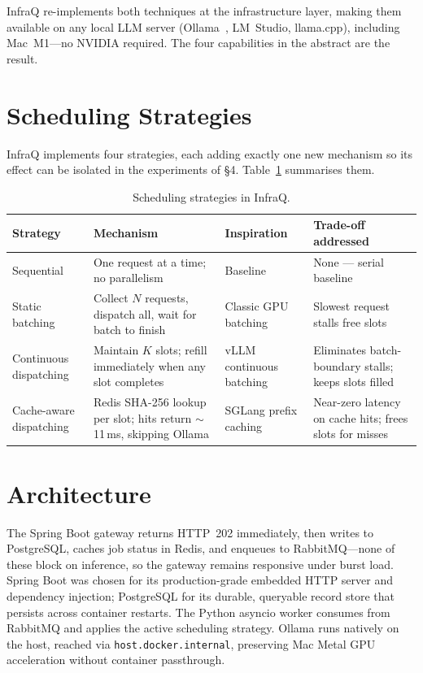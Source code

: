 \documentclass[10pt,a4paper]{article}
\begin{document}
InfraQ re-implements both techniques at the infrastructure layer, making them available
on any local LLM server (Ollama~\cite{ollama}, LM~Studio, llama.cpp), including
Mac~M1---no NVIDIA required. The four capabilities in the abstract are the result.

\section{Scheduling Strategies}

InfraQ implements four strategies, each adding exactly one new mechanism so its effect
can be isolated in the experiments of §4. Table~\ref{tab:strategies} summarises them.

\begin{table}[h]
\centering
\caption{Scheduling strategies in InfraQ.}
\label{tab:strategies}
\small\setlength{\tabcolsep}{5pt}
\renewcommand{\arraystretch}{1.25}
\begin{tabular}{lp{4.0cm}p{2.2cm}p{4.0cm}}
\toprule
Strategy & Mechanism & Inspiration & Trade-off addressed \\
\midrule
Sequential &
  One request at a time; no parallelism &
  Baseline &
  None --- serial baseline \\
Static batching &
  Collect $N$ requests, dispatch all, wait for batch to finish &
  Classic GPU batching &
  Slowest request stalls free slots \\
Continuous dispatching &
  Maintain $K$ slots; refill immediately when any slot completes &
  vLLM continuous batching &
  Eliminates batch-boundary stalls; keeps slots filled \\
Cache-aware dispatching &
  Redis SHA-256 lookup per slot; hits return $\sim$11\,ms, skipping Ollama &
  SGLang prefix caching &
  Near-zero latency on cache hits; frees slots for misses \\
\bottomrule
\end{tabular}
\end{table}

\section{Architecture}

The Spring Boot gateway returns HTTP~202 immediately, then writes to PostgreSQL,
caches job status in Redis, and enqueues to RabbitMQ---none of these block on inference,
so the gateway remains responsive under burst load.
Spring Boot was chosen for its production-grade embedded HTTP server and dependency
injection; PostgreSQL for its durable, queryable record store that persists across
container restarts.
The Python asyncio worker consumes from RabbitMQ and applies the active scheduling
strategy. Ollama runs natively on the host, reached via \texttt{host.docker.internal},
preserving Mac Metal GPU acceleration without container passthrough.
\end{document}
